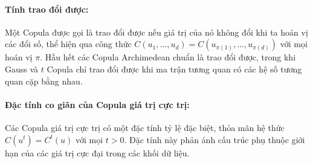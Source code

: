 \paragraph{Tính trao đổi được:}
Một Copula được gọi là trao đổi được nếu giá trị của nó không đổi khi ta hoán vị các đổi số, thể hiện qua công thức $C(u_1, \dots, u_d) = C(u_{\pi(1)}, \dots, u_{\pi(d)})$ với mọi hoán vị $\pi$. Hầu hết các Copula Archimedean chuẩn là trao đổi được, trong khi Gauss và $t$ Copula chỉ trao đổi được khi ma trận tương quan có các hệ số tương quan cặp bằng nhau.

\paragraph{Đặc tính co giãn của Copula giá trị cực trị:}
Các Copula giá trị cực trị có một đặc tính tỷ lệ đặc biệt, thỏa mãn hệ thức $C(u^t) = C^t(u)$ với mọi $t > 0$. Đặc tính này phản ánh cấu trúc phụ thuộc giới hạn của các giá trị cực đại trong các khối dữ liệu.
